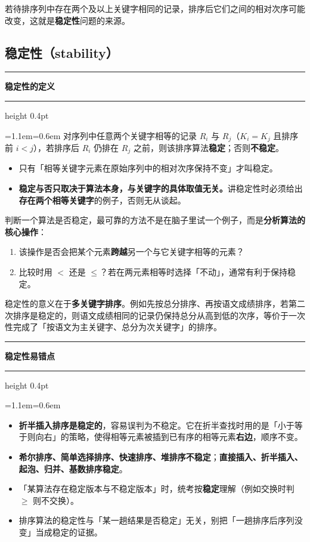 \documentclass[11pt,openany,UTF8]{ctexbook}
\newcommand{\callouthead}[2]{%
  \par\addvspace{7pt}\noindent
  {\color{#1}\rule[-0.15em]{3pt}{1.05em}}\hspace{0.5em}%
  {\bfseries\color{#1}#2}\par\nobreak\vspace{-0.35em}%
  {\color{rulesep}\hrule height 0.4pt}\nobreak\vspace{0.45em}%
  \begingroup\small\setlength{\parindent}{0pt}%
  \leftskip=1.1em\rightskip=0.6em\noindent\ignorespaces}
\newcommand{\calloutend}{\par\endgroup\addvspace{7pt}}
\newenvironment{callkey}[1]{\callouthead{keybar}{#1}}{\calloutend}
\newenvironment{callwarn}[1]{\callouthead{warnbar}{#1}}{\calloutend}
\begin{document}
若待排序列中存在两个及以上关键字相同的记录，排序后它们之间的相对次序可能改变，这就是\textbf{稳定性}问题的来源。

\subsection{稳定性（stability）}

\begin{callkey}{稳定性的定义}
对序列中任意两个关键字相等的记录 $R_i$ 与 $R_j$（$K_i=K_j$ 且排序前 $i<j$），若排序后 $R_i$ 仍排在 $R_j$ 之前，则该排序算法\textbf{稳定}；否则\textbf{不稳定}。

\begin{itemize}
\item 只有「相等关键字元素在原始序列中的相对次序保持不变」才叫稳定。
\item \textbf{稳定与否只取决于算法本身，与关键字的具体取值无关。}讲稳定性时必须给出\textbf{存在两个相等关键字}的例子，否则无从谈起。
\end{itemize}
\end{callkey}

判断一个算法是否稳定，最可靠的方法不是在脑子里试一个例子，而是\textbf{分析算法的核心操作}：

\begin{enumerate}
\item 该操作是否会把某个元素\textbf{跨越}另一个与它关键字相等的元素？
\item 比较时用 $<$ 还是 $\le$？若在两元素相等时选择「不动」，通常有利于保持稳定。
\end{enumerate}
稳定性的意义在于\textbf{多关键字排序}。例如先按总分排序、再按语文成绩排序，若第二次排序是稳定的，则语文成绩相同的记录仍保持总分从高到低的次序，等价于一次性完成了「按语文为主关键字、总分为次关键字」的排序。

\begin{callwarn}{稳定性易错点}
\begin{itemize}
\item \textbf{折半插入排序是稳定的}，容易误判为不稳定。它在折半查找时用的是「小于等于则向右」的策略，使得相等元素被插到已有序的相等元素\textbf{右边}，顺序不变。
\item \textbf{希尔排序、简单选择排序、快速排序、堆排序不稳定}；\textbf{直接插入、折半插入、起泡、归并、基数排序稳定}。
\item 「某算法存在稳定版本与不稳定版本」时，统考按\textbf{稳定}理解（例如交换时判 $\ge$ 则不交换）。
\item 排序算法的稳定性与「某一趟结果是否稳定」无关，别把「一趟排序后序列没变」当成稳定的证据。
\end{itemize}
\end{callwarn}
\end{document}
